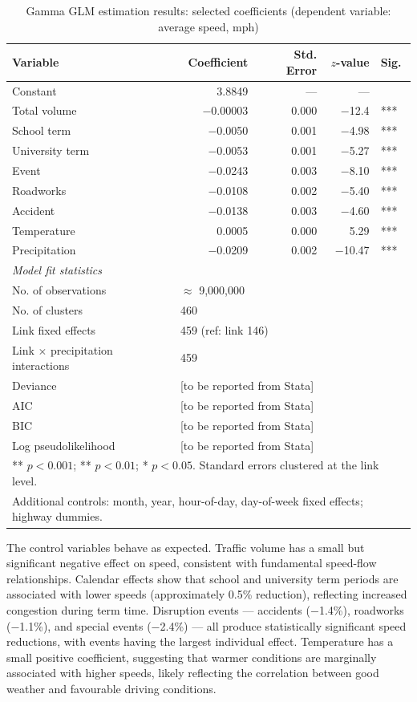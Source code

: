 \documentclass[review]{elsarticle}
\begin{document}
\begin{table}[htbp]
\centering
\caption{Gamma GLM estimation results: selected coefficients (dependent variable: average speed, mph)}
\label{tab:glm}
\begin{tabular}{lrrrl}
\toprule
Variable & Coefficient & Std. Error & $z$-value & Sig. \\
\midrule
Constant & 3.8849 & --- & --- & \\
Total volume & $-$0.00003 & 0.000 & $-$12.4 & *** \\
School term & $-$0.0050 & 0.001 & $-$4.98 & *** \\
University term & $-$0.0053 & 0.001 & $-$5.27 & *** \\
Event & $-$0.0243 & 0.003 & $-$8.10 & *** \\
Roadworks & $-$0.0108 & 0.002 & $-$5.40 & *** \\
Accident & $-$0.0138 & 0.003 & $-$4.60 & *** \\
Temperature & 0.0005 & 0.000 & 5.29 & *** \\
Precipitation & $-$0.0209 & 0.002 & $-$10.47 & *** \\
\midrule
\multicolumn{5}{l}{\textit{Model fit statistics}} \\
No. of observations & \multicolumn{4}{l}{$\approx$ 9{,}000{,}000} \\
No. of clusters & \multicolumn{4}{l}{460} \\
Link fixed effects & \multicolumn{4}{l}{459 (ref: link 146)} \\
Link $\times$ precipitation interactions & \multicolumn{4}{l}{459} \\
Deviance & \multicolumn{4}{l}{[to be reported from Stata]} \\
AIC & \multicolumn{4}{l}{[to be reported from Stata]} \\
BIC & \multicolumn{4}{l}{[to be reported from Stata]} \\
Log pseudolikelihood & \multicolumn{4}{l}{[to be reported from Stata]} \\
\bottomrule
\multicolumn{5}{l}{\footnotesize *** $p < 0.001$; ** $p < 0.01$; * $p < 0.05$. Standard errors clustered at the link level.} \\
\multicolumn{5}{l}{\footnotesize Additional controls: month, year, hour-of-day, day-of-week fixed effects; highway dummies.} \\
\end{tabular}
\end{table}

The control variables behave as expected. Traffic volume has a small but significant negative effect on speed, consistent with fundamental speed-flow relationships. Calendar effects show that school and university term periods are associated with lower speeds (approximately 0.5\% reduction), reflecting increased congestion during term time. Disruption events --- accidents ($-$1.4\%), roadworks ($-$1.1\%), and special events ($-$2.4\%) --- all produce statistically significant speed reductions, with events having the largest individual effect. Temperature has a small positive coefficient, suggesting that warmer conditions are marginally associated with higher speeds, likely reflecting the correlation between good weather and favourable driving conditions.
\end{document}
